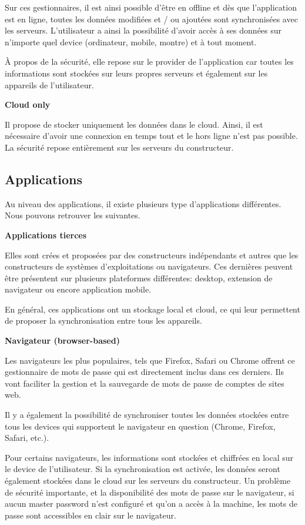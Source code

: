 Sur ces gestionnaires, il est ainsi possible d'être en offline et dès que l'application est en ligne, toutes les données modifiées et / ou ajoutées sont synchronisées avec les serveurs. L'utilisateur a ainsi la possibilité d'avoir accès à ses données sur n'importe quel device (ordinateur, mobile, montre) et à tout moment.

À propos de la sécurité, elle repose sur le provider de l'application car toutes les informations sont stockées sur leurs propres serveurs et également sur les appareils de l'utilisateur.

\textbf{Cloud only} 

Il propose de stocker uniquement les données dans le cloud. Ainsi, il est nécessaire d'avoir une connexion en temps tout et le hors ligne n'est pas possible. La sécurité repose entièrement sur les serveurs du constructeur. 

\subsection{Applications}

Au niveau des applications, il existe plusieurs type d'applications différentes. Nous pouvons retrouver les suivantes.

\textbf{Applications tierces}

Elles sont crées et proposées par des constructeurs indépendants et autres que les constructeurs de systèmes d'exploitations ou navigateurs. Ces dernières peuvent être présentent sur plusieurs plateformes différentes: desktop, extension de navigateur ou encore application mobile. 

En général, ces applications ont un stockage local et cloud, ce qui leur permettent de proposer la synchronisation entre tous les appareils. 

\textbf{Navigateur (browser-based)}

Les navigateurs les plus populaires, tels que Firefox, Safari ou Chrome offrent ce gestionnaire de mots de passe qui est directement inclus dans ces derniers.
Ils vont faciliter la gestion et la sauvegarde de mots de passe de comptes de sites web.

Il y a également la possibilité de synchroniser toutes les données stockées entre tous les devices qui supportent le navigateur en question (Chrome, Firefox, Safari, etc.).

Pour certains navigateurs, les informations sont stockées et chiffrées en local sur le device de l'utilisateur. Si la synchronisation est activée, les données seront également stockées dans le cloud sur les serveurs du constructeur. Un problème de sécurité importante, et la disponibilité des mots de passe sur le navigateur, si aucun master password n'est configuré et qu'on a accès à la machine, les mots de passe sont accessibles en clair sur le navigateur.

